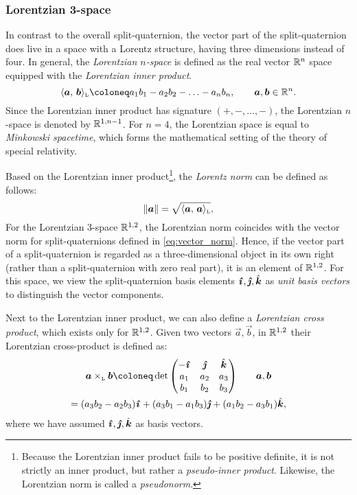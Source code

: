 \subsubsection{Lorentzian 3-space}
In contrast to the overall split-quaternion, the vector part of the split-quaternion does live in a space with a Lorentz structure, having three dimensions instead of four. In general, the \emph{Lorentzian $n$-space} is defined as the real vector $\mathbb{R}^n$ space equipped with the \emph{Lorentzian inner product}. 
\begin{equation}
     \lorinner{\vec{a}}{\vec{b}} \coloneq a_1b_1 - a_2b_2 - \ldots - a_nb_n, \qquad \vec{a}, \vec{b} \in \real^n.
     \label{eq:lorinner}
\end{equation}
Since the Lorentzian inner product has signature $(+, -, \ldots, -)$, the Lorentzian $n$-space is denoted by $\mathbb{R}^{1, n-1}$. For $n = 4$, the Lorentzian space is equal to \emph{Minkowski spacetime}, which forms the mathematical setting of the theory of special relativity. 

Based on the Lorentzian inner product\footnote
{
    Because the Lorentzian inner product fails to be positive definite, it is not strictly an inner product, but rather a \emph{pseudo-inner product}. Likewise, the Lorentzian norm is called a \emph{pseudonorm}.
}, the \emph{Lorentz norm} can be defined as follows:
\begin{equation}
    \norm{\vec{a}} = \sqrt{\lorinner{\vec{a}}{\vec{a}}},
\end{equation}
For the Lorentzian 3-space $\mathbb{R}^{1, 2}$, the Lorentzian norm coincides with the vector norm for split-quaternions defined in \cref{eq:vector_norm}. Hence, if the vector part of a split-quaternion is regarded as a three-dimensional object in its own right (rather than a split-quaternion with zero real part), it is an element of $\mathbb{R}^{1, 2}$. For this space, we view the split-quaternion basis elements $\quati, \quatj, \quatk$ as \emph{unit basis vectors} to distinguish the vector components.

Next to the Lorentzian inner product, we can also define a \emph{Lorentzian cross product}, which exists only for $\mathbb{R}^{1, 2}$. Given two vectors $\vec{a}, \vec{b}$, in $\mathbb{R}^{1, 2}$
their Lorentzian cross-product is defined as: \cite{Jafari2014}
\begin{gather}
        \lorcrossp{\vec{a}}{\vec{b}} \coloneq \det\mqty(-\quati & \quatj & \quatk \\ a_1 & a_2 & a_3 \\ b_1 & b_2 & b_3) \qquad \vec{a}, \vec{b} \\
            = \qty(a_3b_2 - a_2b_3)\quati + \qty(a_3b_1 - a_1b_3)\quatj + \qty(a_1b_2 - a_3b_1)\quatk,
        \label{eq:lorcross}
\end{gather}
where we have assumed $\quati, \quatj, \quatk$ as basis vectors.

